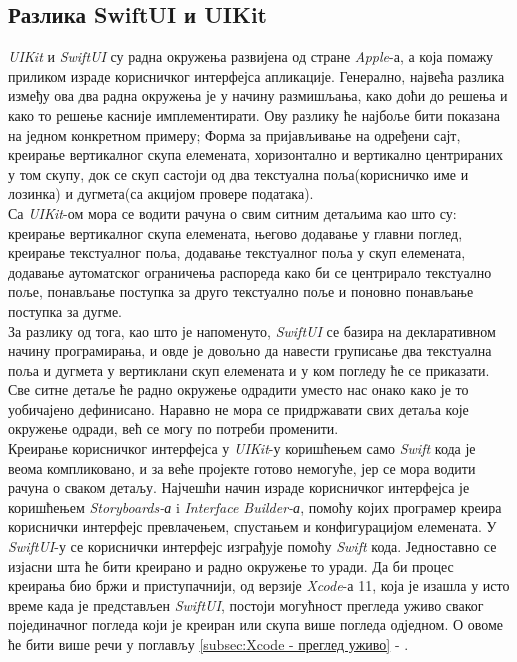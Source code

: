 \documentclass[12pt,oneside]{memoir}
\begin{document}
\subsection{Разлика SwiftUI и UIKit}
\label{subsec:Разлика SwiftUI и UIKit}

\indent \textit{UIKit} и \textit{SwiftUI} су радна окружења развијена од стране \textit{Apple}-а, а која помажу приликом израде корисничког интерфејса апликације. Генерално, највећа разлика између ова два радна окружења је у начину размишљања, како доћи до решења и како то решење касније имплементирати. Ову разлику ће најбоље бити показана на једном конкретном примеру; Форма за пријављивање на одређени сајт, креирање вертикалног скупа елемената, хоризонтално и вертикално центрираних у том скупу, док се скуп састоји од два текстуална поља(корисничко име и лозинка) и дугмета(са акцијом провере података).
\\
\indent Са \textit{UIKit}-ом мора се водити рачуна о свим ситним детаљима као што су: креирање вертикалног скупа елемената, његово додавање у главни поглед, креирање текстуалног поља, додавање текстуалног поља у скуп елемената, додавање аутоматског ограничења распореда како би се центрирало текстуално поље, понављање поступка за друго текстуално поље и поновно понављање поступка за дугме. 
\\
\indent За разлику од тога, као што је напоменуто, \textit{SwiftUI} се базира на декларативном начину програмирања, и овде је довољно да навести груписање два текстуална поља и дугмета у вертиклани скуп елемената и у ком погледу ће се приказати. Све ситне детаље ће радно окружење одрадити уместо нас онако како је то уобичајено дефинисано. Наравно не мора се придржавати свих детаља које окружење одради, већ се могу по потреби променити.
\\
\indent Креирање корисничког интерфејса у \textit{UIKit}-у коришћењем само \textit{Swift} кода је веома компликовано, и за веће пројекте готово немогуће, јер се мора водити рачуна о сваком детаљу. Најчешћи начин израде корисничког интерфејса је коришћењем \textit{Storyboards-а} i \textit{Interface Builder-а}, помоћу којих програмер креира кориснички интерфејс превлачењем, спустањем и конфигурацијом елемената. У \textit{SwiftUI}-у се кориснички интерфејс изграђује помоћу \textit{Swift} кода. Једноставно се изјасни шта ће бити креирано и радно окружење то уради. Да би процес креирања био бржи и приступачнији, од верзије \textit{Xcode}-а 11, која је изашла у исто време када је представљен \textit{SwiftUI}, постоји могућност прегледа уживо сваког појединачног погледа који је креиран или скупа више погледа одједном. О овоме ће бити више речи у поглављу \ref{subsec:Xcode - преглед уживо} - .
\end{document}
